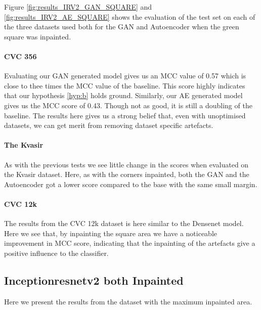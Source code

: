 \noindent Figure \ref{fig:results_IRV2_GAN_SQUARE} and \ref{fig:results_IRV2_AE_SQUARE} shows the evaluation of the test set on each of the three datasets used both for the GAN and Autoencoder when the green square was inpainted. 

\paragraph{CVC 356}
Evaluating our GAN generated model gives us an MCC value of 0.57 which is close to thee times the MCC value of the baseline.  This score highly indicates that our hypothesis \ref{hyp:b} holds ground.
Similarly, our AE generated model gives us the MCC score of 0.43. Though not as good, it is still a doubling of the baseline.
The results here gives us a strong belief that, even with unoptimised datasets, we can get merit from removing dataset specific artefacts.


\paragraph{The Kvasir}
As with the previous tests we see little change in the scores when evaluated on the Kvasir dataset.
Here, as with the corners inpainted, both the GAN and the Autoencoder got a lower score compared to the base with the same small margin. 


\paragraph{CVC 12k}
The results from the CVC 12k dataset is here similar to the Densenet model. Here we see that, by inpainting the square area we have a noticeable improvement in MCC score, indicating that the inpainting of the artefacts give a positive influence to the classifier.













\FloatBarrier
\subsection{Inceptionresnetv2 both Inpainted}
Here we present the results from the dataset with the maximum inpainted area.


